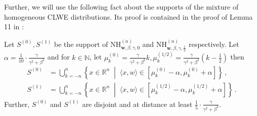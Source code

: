 \documentclass{theoretics}
\newcommand{\Set}[1]{\left\{#1\right\}}
\newcommand{\iprod}[1]{\langle#1\rangle}
\newcommand{\suchthat}{\;\middle\vert\;}
\newcommand{\N}{\mathbb N}
\newcommand{\R}{\mathbb R}
\newcommand{\nhclwed}[4]{\mathrm{NH}_{#1,#2,#3,#4}}
\begin{document}
Further, we will use the following fact about the supports of the mixture of homogeneous CLWE distributions.
Its proof is contained in the proof of Lemma 11 in \cite{tiegel_agnostic_lattices}:
\begin{fact}
    \label{fact:support_intersection_distribution}
    Let $S^{(0)},S^{(1)}$ be the support of $\nhclwed{\bm w}{\beta}{\gamma}{0}^{(n)}$ and $\nhclwed{\bm w}{\beta}{\gamma}{\tfrac 1 2}^{(n)}$ respectively.
    Let $\alpha = \tfrac 1 {10} \cdot \tfrac \gamma {\gamma^2 + \beta^2}$ and for $k \in \N$, let $\mu_k^{(0)} = \tfrac \gamma {\gamma^2 + \beta^2} k,\mu_k^{(1/2)} = \tfrac \gamma {\gamma^2 + \beta^2} (k-\tfrac 1 2)$ then
    \begin{align*}
        S^{(0)} &= \bigcup_{k=-n}^n \Set{x \in \R^n \suchthat \iprod{x, w} \in [\mu_k^{(0)}-\alpha,\mu_k^{(0)}+\alpha]} \,, \\
        S^{(1)} &= \bigcup_{k=-n}^n \Set{x \in \R^n \suchthat \iprod{x, w} \in [\mu_k^{(1/2)}-\alpha,\mu_k^{(1/2)}+\alpha]} \,.
    \end{align*}
    Further, $S^{(0)}$ and $S^{(1)}$ are disjoint and at distance at least $\tfrac 1 5 \cdot \tfrac \gamma {\gamma^2 + \beta^2}$.
\end{fact}
\end{document}
